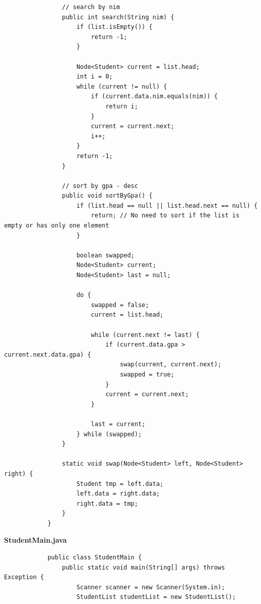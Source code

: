 \documentclass[12pt,titlepage]{article}
\begin{document}
\begin{enumerate}
{\begin{verbatim}
                // search by nim
                public int search(String nim) {
                    if (list.isEmpty()) {
                        return -1;
                    }

                    Node<Student> current = list.head;
                    int i = 0;
                    while (current != null) {
                        if (current.data.nim.equals(nim)) {
                            return i;
                        }
                        current = current.next;
                        i++;
                    }
                    return -1;
                }

                // sort by gpa - desc
                public void sortByGpa() {
                    if (list.head == null || list.head.next == null) {
                        return; // No need to sort if the list is empty or has only one element
                    }

                    boolean swapped;
                    Node<Student> current;
                    Node<Student> last = null;

                    do {
                        swapped = false;
                        current = list.head;

                        while (current.next != last) {
                            if (current.data.gpa > current.next.data.gpa) {
                                swap(current, current.next);
                                swapped = true;
                            }
                            current = current.next;
                        }

                        last = current;
                    } while (swapped);
                }

                static void swap(Node<Student> left, Node<Student> right) {
                    Student tmp = left.data;
                    left.data = right.data;
                    right.data = tmp;
                }
            }
        \end{verbatim}

        \large{\textbf{StudentMain.java}}
        \begin{verbatim}
            public class StudentMain {
                public static void main(String[] args) throws Exception {
                    Scanner scanner = new Scanner(System.in);
                    StudentList studentList = new StudentList();


\end{verbatim}}
\end{enumerate}
\end{document}
